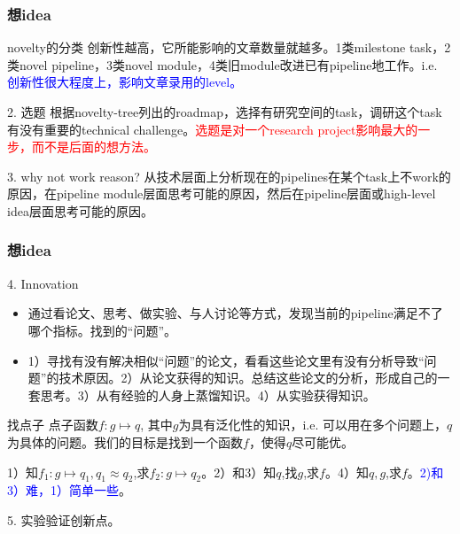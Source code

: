 \documentclass{beamer}
\begin{document}
\begin{frame}
    \frametitle{想idea}
    \begin{exampleblock}{novelty的分类}
        创新性越高，它所能影响的文章数量就越多。1类milestone task，2类novel pipeline，3类novel module，4类旧module改进已有pipeline地工作。i.e. \textcolor{blue}{创新性很大程度上，影响文章录用的level。}
    \end{exampleblock}
    \begin{block}{2. 选题}
        根据novelty-tree列出的roadmap，选择有研究空间的task，调研这个task有没有重要的technical challenge。\textcolor{red}{选题是对一个research project影响最大的一步，而不是后面的想方法。}
    \end{block}
    \begin{block}{3. why not work reason?}
        从技术层面上分析现在的pipelines在某个task上不work的原因，在pipeline module层面思考可能的原因，然后在pipeline层面或high-level idea层面思考可能的原因。
    \end{block}

\end{frame}

\begin{frame}
    \frametitle{想idea}
    \begin{block}{4. Innovation}
        \begin{itemize}
            \item 通过看论文、思考、做实验、与人讨论等方式，发现当前的pipeline满足不了哪个指标。找到的“问题”。
            \item 1）寻找有没有解决相似“问题”的论文，看看这些论文里有没有分析导致“问题”的技术原因。2）从论文获得的知识。总结这些论文的分析，形成自己的一套思考。3）从有经验的人身上蒸馏知识。4）从实验获得知识。
        \end{itemize}
    \end{block}
    \begin{exampleblock}{找点子}
        点子函数$f:g\mapsto q$, 其中$g$为具有泛化性的知识，i.e. 可以用在多个问题上，$q$为具体的问题。我们的目标是找到一个函数$f$，使得$q$尽可能优。

        1）知$f_1:g\mapsto q_1,q_1\approx q_2$,求$f_2:g\mapsto q_2$。2）和3）知$q$,找$g$,求$f$。4）知$q,g$,求$f$。\textcolor{blue}{2)和3）难，1）简单一些}。
    \end{exampleblock}
    5. 实验验证创新点。
\end{frame}
\end{document}
